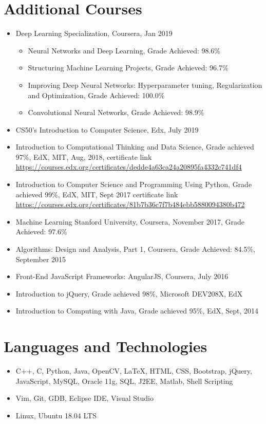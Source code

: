 \documentclass[a4paper,10pt]{article}
\begin{document}
    \section{Additional Courses}
	\begin{itemize}
	        \item Deep Learning Specialization, Coursera, Jan 2019
	            \begin{itemize}
	                \item Neural Networks and Deep Learning, Grade Achieved: 98.6\%
                    \item Structuring Machine Learning Projects, Grade Achieved: 96.7\%
                    \item Improving Deep Neural Networks: Hyperparameter tuning, Regularization and Optimization, Grade Achieved: 100.0\%
                    \item Convolutional Neural Networks, Grade Achieved: 98.9\%
	            \end{itemize}
            \item CS50's Introduction to Computer Science, Edx, July 2019
	        \item Introduction to Computational Thinking and Data Science, Grade achieved 97\%, EdX, MIT, Aug, 2018, certificate link \url{https://courses.edx.org/certificates/dedde4a63ca24a20895fa4332c741df4}
	        \item Introduction to Computer Science and Programming Using Python, Grade achieved  99\%, EdX, MIT, Sept 2017 certificate link \url{https://courses.edx.org/certificates/81b7b36c7f7b484ebb5880094380b472}
	        \item Machine Learning Stanford University, Coursera, November 2017, Grade Achieved: 97.6\%
	        \item Algorithms: Design and Analysis, Part 1, Coursera, Grade Achieved: 84.5\%, September 2015
	        \item Front-End JavaScript Frameworks: AngularJS, Coursera, July 2016
	        \item Introduction to jQuery,  Grade achieved 98\%, Microsoft DEV208X, EdX
	        \item Introduction to Computing with Java, Grade achieved 95\%, EdX, Sept, 2014
	    \end{itemize}
	
	\section{Languages and Technologies}
	\begin{itemize}
        		\item C++, C, Python, Java, OpenCV, {\LaTeX}, HTML, CSS, Bootstrap, jQuery, JavaScript, MySQL, Oracle 11g, SQL, J2EE, Matlab, Shell Scripting
	    	\item Vim, Git, GDB, Eclipse IDE, Visual Studio
        		\item Linux, Ubuntu 18.04 LTS
	\end{itemize}
	
\end{document}
